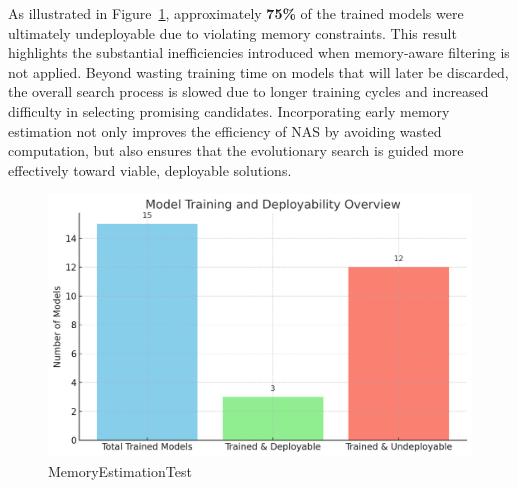 As illustrated in Figure~\ref{fig:memoryEstimationTest}, approximately \textbf{75\%} of the trained models were ultimately undeployable due to violating memory constraints. This result highlights the substantial inefficiencies introduced when memory-aware filtering is not applied. Beyond wasting training time on models that will later be discarded, the overall search process is slowed due to longer training cycles and increased difficulty in selecting promising candidates. Incorporating early memory estimation not only improves the efficiency of NAS by avoiding wasted computation, but also ensures that the evolutionary search is guided more effectively toward viable, deployable solutions.

\clearpage

\begin{table}[ht]
\noindent %
\hspace*{-\oddsidemargin} %
\caption{Performance summary of two TakuNet models.}
\label{tab:taku_models}
\end{table}

\bigskip

\begin{figure}[ht]
    \centering
    \includegraphics[width=0.85\linewidth]{Pictures/MemoryEstimationTest.png}
    \caption{MemoryEstimationTest}
    \label{fig:memoryEstimationTest}
\end{figure}





